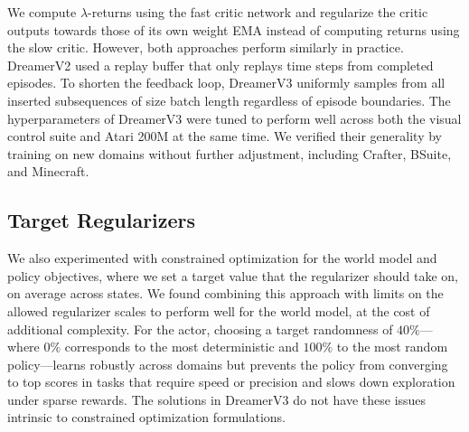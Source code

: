 \begin{itemize}
 We compute $\lambda$-returns using the fast critic network and regularize the critic outputs towards those of its own weight EMA instead of computing returns using the slow critic. However, both approaches perform similarly in practice.
 DreamerV2 used a replay buffer that only replays time steps from completed episodes. To shorten the feedback loop, DreamerV3 uniformly samples from all inserted subsequences of size batch length regardless of episode boundaries.
 The hyperparameters of DreamerV3 were tuned to perform well across both the visual control suite and Atari 200M at the same time. We verified their generality by training on new domains without further adjustment, including Crafter, BSuite, and Minecraft.
\end{itemize}

\subsection*{Target Regularizers}

We also experimented with constrained optimization for the world model and policy objectives, where we set a target value that the regularizer should take on, on average across states.
We found combining this approach with limits on the allowed regularizer scales to perform well for the world model, at the cost of additional complexity.
For the actor, choosing a target randomness of $40\%$---where $0\%$ corresponds to the most deterministic and $100\%$ to the most random policy---learns robustly across domains but prevents the policy from converging to top scores in tasks that require speed or precision and slows down exploration under sparse rewards.
The solutions in DreamerV3 do not have these issues intrinsic to constrained optimization formulations.

\restoregeometry